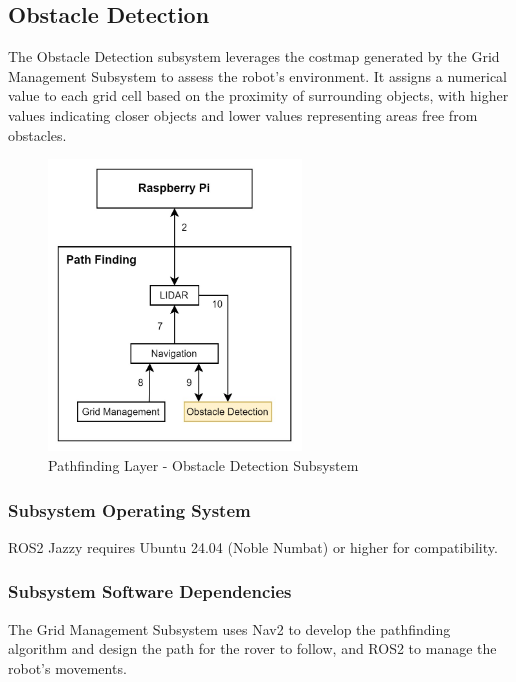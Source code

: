 \newpage

\subsection{Obstacle Detection}

The Obstacle Detection subsystem leverages the costmap generated by the Grid Management Subsystem to assess the robot's environment. It assigns a numerical value to each grid cell based on the proximity of surrounding objects, with higher values indicating closer objects and lower values representing areas free from obstacles.


\begin{figure}[h!]
	\centering
 	\includegraphics[width=0.60\textwidth]{images/pathfinding/4_obstacle.jpg}
 \caption{Pathfinding Layer - Obstacle Detection Subsystem}
\end{figure}



\subsubsection{Subsystem Operating System}
ROS2 Jazzy requires Ubuntu 24.04 (Noble Numbat) or higher for compatibility.
\subsubsection{Subsystem Software Dependencies}
The Grid Management Subsystem uses Nav2 to develop the pathfinding algorithm and design the path for the rover to follow, and ROS2 to manage the robot's movements.


